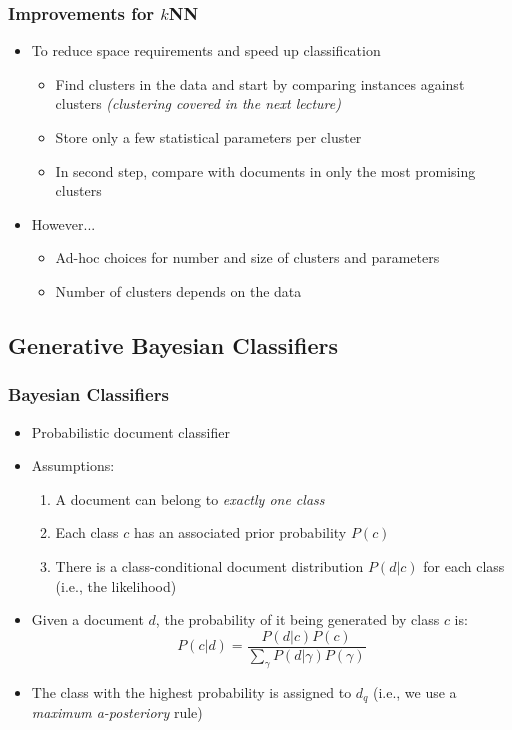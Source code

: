 \documentclass{beamer}
\begin{document}
\begin{frame}
  \frametitle{Improvements for $k$NN}

  \begin{itemize}
  \item To reduce space requirements and speed up classification
    \begin{itemize}
    \item Find clusters in the data and start by comparing instances against clusters \emph{(clustering covered in the next lecture)}
    \item Store only a few statistical parameters per cluster
    \item In second step, compare with documents in only the most promising clusters
    \end{itemize}
  \item However...
    \begin{itemize}
    \item Ad-hoc choices for number and size of clusters and parameters
    \item Number of clusters depends on the data
    \end{itemize}
  \end{itemize}

\end{frame}


\subsection{Generative Bayesian Classifiers}

\begin{frame} \frametitle{Bayesian Classifiers}
  
  \begin{itemize}
  \item Probabilistic document classifier
  \item Assumptions:
    \begin{enumerate}
    \item A document can belong to \emph{exactly one class}
    \item Each class $c$ has an associated prior probability $P(c)$
    \item There is a class-conditional document distribution $P(d|c)$ for each
      class (i.e., the likelihood)
    \end{enumerate}
  \item Given a document $d$, the probability of it being generated by class
    $c$ is:
    \begin{displaymath}
      P(c|d) = \frac{P(d|c)P(c)}{\sum_{\gamma}P(d|\gamma)P(\gamma)}
    \end{displaymath}
  \item The class with the highest probability is assigned to $d_q$ (i.e., we use a {\it maximum a-posteriory} rule)
  \end{itemize}

\end{frame}
\end{document}
